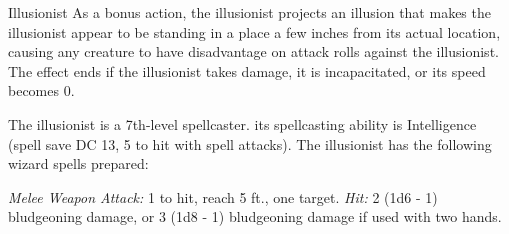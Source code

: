 \documentclass[10pt,a4paper,twoside,bg=print,twocolumn,openany,nodeprecatedcode]{dndbook}
\begin{document}
\begin{DndMonster}[float=t]{Illusionist}
\DndMonsterBasics[
armor-class = {12 (15 with \textit{mage armor})},
hit-points = {\DndDice{7d8 + 7}},
speed = {30 ft.}
]
\DndMonsterAbilityScores[
 str = 9,
 dex = 14,
 con = 13,
 int = 16,
 wis = 11,
 cha = 12
]
\DndMonsterDetails[
saving-throws = {Int +5, Wis +2},
skills = {Arcana +5, History +5},
languages = {any four languages},
challenge = 3,
]
As a bonus action, the illusionist projects an illusion that makes the illusionist appear to be standing in a place a few inches from its actual location, causing any creature to have disadvantage on attack rolls against the illusionist. The effect ends if the illusionist takes damage, it is incapacitated, or its speed becomes 0.

The illusionist is a 7th-level spellcaster. its spellcasting ability is Intelligence (spell save DC 13, 5 to hit with spell attacks). The illusionist has the following wizard spells prepared:
\begin{DndMonsterSpells}
\end{DndMonsterSpells}
\textsl{Melee Weapon Attack:} 1 to hit, reach 5 ft., one target. \textsl{Hit:} 2 (1d6 - 1) bludgeoning damage, or 3 (1d8 - 1) bludgeoning damage if used with two hands.

\end{DndMonster}
\end{document}
